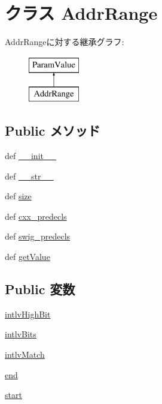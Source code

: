 \hypertarget{classm5_1_1params_1_1AddrRange}{
\section{クラス AddrRange}
\label{classm5_1_1params_1_1AddrRange}
}
AddrRangeに対する継承グラフ:\begin{figure}[H]
\begin{center}
\leavevmode
\includegraphics[height=2cm]{classm5_1_1params_1_1AddrRange}
\end{center}
\end{figure}
\subsection*{Public メソッド}
\begin{DoxyCompactItemize}
\item 
def \hyperlink{classm5_1_1params_1_1AddrRange_ac775ee34451fdfa742b318538164070e}{\_\-\_\-init\_\-\_\-}
\item 
def \hyperlink{classm5_1_1params_1_1AddrRange_aa7a4b9bc0941308e362738503137460e}{\_\-\_\-str\_\-\_\-}
\item 
def \hyperlink{classm5_1_1params_1_1AddrRange_a8e64882b52bf2db69e0ec31977c83dc4}{size}
\item 
def \hyperlink{classm5_1_1params_1_1AddrRange_a0b408a11a14bd1d770e28f71a6e14ab5}{cxx\_\-predecls}
\item 
def \hyperlink{classm5_1_1params_1_1AddrRange_ab3dbcf5716623eac67a8ccc074fa7e13}{swig\_\-predecls}
\item 
def \hyperlink{classm5_1_1params_1_1AddrRange_acc340fbd4335fa34f9d57fb454b28ed0}{getValue}
\end{DoxyCompactItemize}
\subsection*{Public 変数}
\begin{DoxyCompactItemize}
\item 
\hyperlink{classm5_1_1params_1_1AddrRange_a438082b3a41e0118681dc310c8830e14}{intlvHighBit}
\item 
\hyperlink{classm5_1_1params_1_1AddrRange_a59fb29811138277b395da051c1c9d589}{intlvBits}
\item 
\hyperlink{classm5_1_1params_1_1AddrRange_aaf62f123726dad820b8d0a2c84543e2e}{intlvMatch}
\item 
\hyperlink{classm5_1_1params_1_1AddrRange_afb358f48b1646c750fb9da6c6585be2b}{end}
\item 
\hyperlink{classm5_1_1params_1_1AddrRange_a550769bbd4e7537ff90a656f5b0c23b2}{start}
\end{DoxyCompactItemize}
